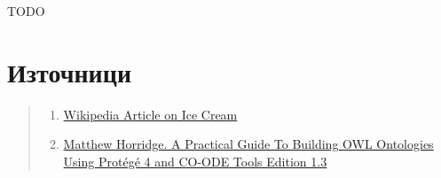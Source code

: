 \documentclass[12pt]{article}
\begin{document}
TODO







\listoffigures

\section{Източници}

\begin{quote}

    \begin{enumerate}
    
    \item \href{https://en.wikipedia.org/wiki/Ice_cream}{Wikipedia Article on Ice Cream}
    
    \item \href{https://www.researchgate.net/publication/272829948_A_Practical_Guide_To_Building_OWL_Ontologies_Using_Protege_4_and_CO-ODE_Tools_Edition_13}{Matthew Horridge. A Practical Guide To Building OWL Ontologies Using Protégé 4 and CO-ODE Tools Edition 1.3}

    
    
    \end{enumerate}

\end{quote}
\end{document}

